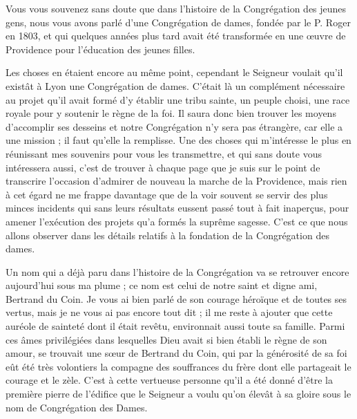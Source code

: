 Vous vous souvenez sans doute que dans l'histoire de la Congrégation des jeunes gens, nous vous avons parlé d'une Congrégation de dames, fondée par le P. Roger en 1803, et qui quelques années plus tard avait été transformée en une œuvre de Providence pour l'éducation des jeunes filles.

Les choses en étaient encore au même point, cependant le Seigneur voulait qu'il existât à Lyon une Congrégation de dames. C'était là un complément nécessaire au projet qu'il avait formé d'y établir une tribu sainte, un peuple choisi, une race royale pour y soutenir le règne de la foi. Il saura donc bien trouver les moyens d'accomplir ses desseins et notre Congrégation n'y sera pas étrangère, car elle a une mission ; il faut qu'elle la remplisse. Une des choses qui m'intéresse le plus en réunissant mes souvenirs pour vous les transmettre, et qui sans doute vous intéressera aussi, c'est de trouver à chaque page que je suis sur le point de transcrire l'occasion d'admirer de nouveau la marche de la Providence, mais rien à cet égard ne me frappe davantage que de la voir souvent se
servir des plus minces incidents qui sans leurs résultats eussent passé tout à fait inaperçus, pour amener l'exécution des projets qu'a formés la suprême sagesse. C'est ce que nous allons observer dans les détails relatifs à la fondation de la Congrégation des dames.

Un nom qui a déjà paru dans l'histoire de la Congrégation va se retrouver encore aujourd'hui sous ma plume ; ce nom est celui de notre saint et digne ami, Bertrand du Coin. Je vous ai bien parlé de son courage héroïque et de toutes ses vertus, mais je ne vous ai pas encore tout dit ; il me reste à ajouter que cette auréole de sainteté dont il était revêtu, environnait aussi toute sa famille. Parmi ces âmes privilégiées dans lesquelles Dieu avait si bien établi le règne de son amour, se trouvait une sœur de Bertrand du Coin, qui par la générosité de sa foi eût été très volontiers la compagne des souffrances du frère dont elle partageait le courage et le zèle. C'est à cette vertueuse personne qu'il a été donné d'être la première pierre de l'édifice que le Seigneur a voulu qu'on élevât à sa gloire sous le nom de Congrégation des Dames.

